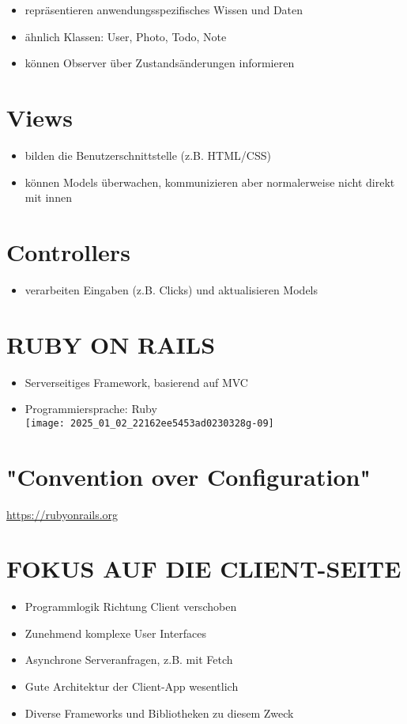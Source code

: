 \begin{itemize}
  \item repräsentieren anwendungsspezifisches Wissen und Daten
  \item ähnlich Klassen: User, Photo, Todo, Note
  \item können Observer über Zustandsänderungen informieren
\end{itemize}

\section*{Views}
\begin{itemize}
  \item bilden die Benutzerschnittstelle (z.B. HTML/CSS)
  \item können Models überwachen, kommunizieren aber normalerweise nicht direkt mit innen
\end{itemize}

\section*{Controllers}
\begin{itemize}
  \item verarbeiten Eingaben (z.B. Clicks) und aktualisieren Models
\end{itemize}

\section*{RUBY ON RAILS}
\begin{itemize}
  \item Serverseitiges Framework, basierend auf MVC
  \item Programmiersprache: Ruby\\
\texttt{[image: 2025\_01\_02\_22162ee5453ad0230328g-09]}
\end{itemize}

\section*{"Convention over Configuration"}
\href{https://rubyonrails.org}{https://rubyonrails.org}

\section*{FOKUS AUF DIE CLIENT-SEITE}
\begin{itemize}
  \item Programmlogik Richtung Client verschoben
  \item Zunehmend komplexe User Interfaces
  \item Asynchrone Serveranfragen, z.B. mit Fetch
  \item Gute Architektur der Client-App wesentlich
  \item Diverse Frameworks und Bibliotheken zu diesem Zweck
\end{itemize}

